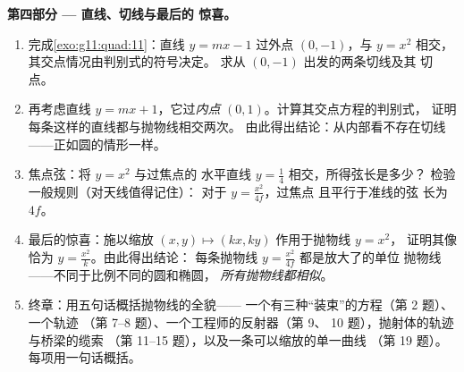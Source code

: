 \begin{problem}
\medskip
\noindent\textbf{第四部分 --- 直线、切线与最后的
惊喜。}
\begin{enumerate}[resume]
  \item 完成\cref{exo:g11:quad:11}：直线
        $y = mx - 1$ 过外点 $(0, -1)$，与
        $y = x^2$ 相交，其交点情况由判别式的符号决定。
        求从 $(0, -1)$ 出发的两条切线及其
        切点。
  \item 再考虑直线 $y = mx + 1$，它过\emph{内点}
        $(0, 1)$。计算其交点方程的判别式，
        证明每条这样的直线都与抛物线相交两次。
        由此得出结论：从内部看不存在切线
        ——正如圆的情形一样。
  \item 焦点弦：将 $y = x^2$ 与过焦点的
        水平直线 $y = \frac14$ 相交，所得弦长是多少？
        检验一般规则（对天线值得记住）：
        对于 $y = \frac{x^2}{4f}$，过焦点
        且平行于准线的弦
        长为 $4f$。
  \item 最后的惊喜：施以缩放
        $(x, y) \mapsto (kx, ky)$ 作用于抛物线 $y = x^2$，
        证明其像恰为 $y = \frac{x^2}{k}$。由此得出结论：
        每条抛物线 $y = \frac{x^2}{4f}$ 都是放大了的单位
        抛物线——不同于比例不同的圆和椭圆，
        \emph{所有抛物线都相似}。
  \item 终章：用五句话概括抛物线的全貌——
        一个有三种“装束”的方程（第 2 题）、一个轨迹
        （第 7--8 题）、一个工程师的反射器（第 9、
        10 题），抛射体的轨迹与桥梁的缆索
        （第 11--15 题），以及一条可以缩放的单一曲线
        （第 19 题）。每项用一句话概括。
\end{enumerate}
\end{problem}
